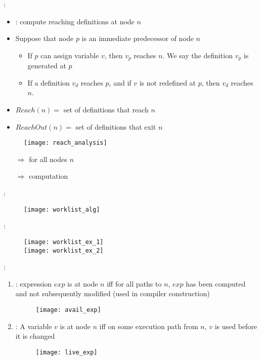  :

\begin{itemize}
    \item {} : compute reaching definitions at node $n$
    \item Suppose that node $p$ is an immediate predecessor of node $n$
    \begin{itemize}
    \item If $p$ can assign variable $v$, then $v_p$ reaches $n$. We say the definition $v_p$ is generated at $p$
    \item If a definition $v_d$ reaches $p$, and if $v$ is not redefined at $p$, then $v_d$ reaches $n$.
    \end{itemize}
    \item $Reach(n) =$ set of definitions that reach $n$
    \item $ReachOut(n) =$ set of definitions that exit $n$
\end{itemize}
\begin{figure}[H]
    \centering
    \texttt{[image: reach\_analysis]}
\end{figure}
\begin{itemize}
    \item[$\Rightarrow$]  for all nodes $n$
    \item[$\Rightarrow$]  computation
\end{itemize}

 :
\begin{figure}[H]
    \centering
    \texttt{[image: worklist\_alg]}
\end{figure}

 :
\begin{figure}[H]
    \centering
    \texttt{[image: worklist\_ex\_1]}\\
    \texttt{[image: worklist\_ex\_2]}
\end{figure}

 :
\begin{enumerate}
    \item {} : expression $exp$ is  at node $n$ iff for all paths to $n$, $exp$ has been computed and not subsequently modified (used in compiler construction)
    \begin{figure}[H]
        \centering
        \texttt{[image: avail\_exp]}
    \end{figure}
    \item {} : A variable $v$ is  at node $n$ iff on some execution path from $n$, $v$ is used before it is changed
    \begin{figure}[H]
        \centering
        \texttt{[image: live\_exp]}
    \end{figure}
\end{enumerate}


